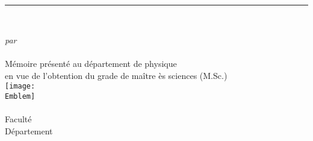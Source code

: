 \documentclass[main.tex]{subfiles}
\begin{document}
\newcommand{\CustomRule}{\rule{13cm}{0.75pt} \\}

\begin{titlepage}

    \centering
    \vspace{5.0cm}
    {
        \textsc{\LARGE\MakeLowercase{\Titre}} \\[0.5cm]
        \textsc{\Large\MakeLowercase{\SousTitre}} \\[1.5cm]
    }
    \vspace{0.5cm}
    \CustomRule
    \vspace{0.3cm}

    \vspace{2.0cm}
    {
        \emph{\large par} \\[0.25cm]
        {\large\Nom} \\[2.5cm]
    }
    \vspace{1.5cm}
    {{Mémoire présenté au département de physique}\\[0.25cm]
    {en vue de l’obtention du grade de maître ès sciences (M.Sc.)}\\[2cm]}
    \vspace{1.5cm}
    \texttt{[image: \\Emblem]} \\
    {
        \large \University \\
        \large Faculté \Faculte \\
        \large Département \Departement \\
        \large \Date
    }

\end{titlepage}
\end{document}
